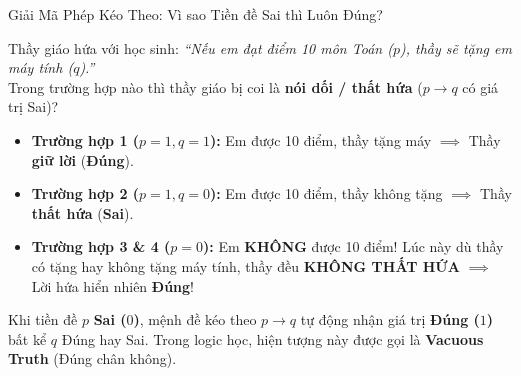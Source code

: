 \documentclass[aspectratio=169, 10pt]{beamer}
\begin{document}
\begin{frame}{Giải Mã Phép Kéo Theo: Vì sao Tiền đề Sai thì Luôn Đúng?}
  \begin{cozyInsight}
    \small
    Thầy giáo hứa với học sinh: \textit{``Nếu em đạt điểm 10 môn Toán ($p$), thầy sẽ tặng em máy tính ($q$).''}\\
    Trong trường hợp nào thì thầy giáo bị coi là \textbf{nói dối / thất hứa} ($p \to q$ có giá trị Sai)?
    \begin{itemize}
      \setlength{\itemsep}{2pt}
      \item \textbf{Trường hợp 1 ($p=1, q=1$):} Em được 10 điểm, thầy tặng máy $\implies$ Thầy \textbf{giữ lời} (\textbf{\textcolor{cozyTrue}{Đúng}}).
      \item \textbf{Trường hợp 2 ($p=1, q=0$):} Em được 10 điểm, thầy không tặng $\implies$ Thầy \textbf{thất hứa} (\textbf{\textcolor{cozyFalse}{Sai}}).
      \item \textbf{Trường hợp 3 \& 4 ($p=0$):} Em \textbf{KHÔNG} được 10 điểm! Lúc này dù thầy có tặng hay không tặng máy tính, thầy đều \textbf{KHÔNG THẤT HỨA} $\implies$ Lời hứa hiển nhiên \textbf{\textcolor{cozyTrue}{Đúng}}!
    \end{itemize}
  \end{cozyInsight}
  \vspace{0.05cm}
  \begin{cozyDef}
    \small
    Khi tiền đề $p$ \textbf{Sai ($0$)}, mệnh đề kéo theo $p \to q$ tự động nhận giá trị \textbf{\textcolor{cozyTrue}{Đúng ($1$)}} bất kể $q$ Đúng hay Sai. Trong logic học, hiện tượng này được gọi là \textbf{Vacuous Truth} (Đúng chân không).
  \end{cozyDef}
\end{frame}
\end{document}
